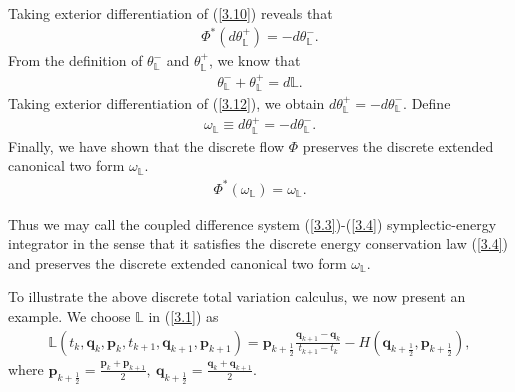 \documentclass[a4paper,a4paper]{article}
\def\q{\boldsymbol{q}}
\def\p{\boldsymbol{p}}
\begin{document}
Taking exterior differentiation of (\ref{3.10}) reveals that
\begin{align}
  \Phi^{*}(d\theta_{\mathbb{L}}^{+})=-d\theta_{\mathbb{L}}^{-}. \label{3.11}
\end{align}
From the definition of $\theta_{\mathbb{L}}^{-}$ and
$\theta_{\mathbb{L}}^{+}$, we know that
\begin{align}
   \theta_{\mathbb{L}}^{-}+\theta_{\mathbb{L}}^{+}=d\mathbb{L}.\label{3.12}
\end{align}
Taking exterior differentiation of (\ref{3.12}), we obtain
$d\theta_{\mathbb{L}}^{+}=-d\theta_{\mathbb{L}}^{-}$.  Define
\begin{align}
 \omega_{\mathbb{L}}\equiv d\theta_{\mathbb{L}}^{+}=
-d\theta_{\mathbb{L}}^{-}.\label{3.13}
\end{align}
Finally, we have shown that the discrete flow $\Phi$ preserves the discrete
extended canonical two form $\omega_{\mathbb{L}}$.
\begin{align}
  \Phi^{*}(\omega_{\mathbb{L}})=\omega_{\mathbb{L}}. \label{3.14}
\end{align}

Thus we may call the coupled difference system
(\ref{3.3})-(\ref{3.4}) symplectic-energy integrator in the sense
that it satisfies the discrete energy conservation law (\ref{3.4})
and preserves the discrete extended canonical two form
$\omega_{\mathbb{L}}$.

To illustrate the above discrete total variation calculus, we now present
an example. We choose $\mathbb{L}$ in (\ref{3.1}) as
\begin{align}
  \mathbb{L}(t_{k}, \q_{k}, \p_{k}, t_{k+1}, \q_{k+1}, \p_{k+1})
     =\p_{k+\frac{1}{2}}\frac{\q_{k+1}-\q_{k}}{t_{k+1}-t_{k}}-H(\q_{k+\frac{1}{2}},
     \p_{k+\frac{1}{2}}), \label{3.15}
\end{align}
where $\p_{k+\frac{1}{2}}=\frac{\p_{k}+\p_{k+1}}{2},~
\q_{k+\frac{1}{2}}=\frac{\q_{k}+\q_{k+1}}{2}$.
\end{document}
